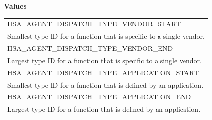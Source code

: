 \documentclass[final,oneside]{book}
\newcommand{\reftyp}[1]{#1}
\newcommand{\refenu}[1]{\reftyp{#1}}
\begin{document}
\noindent\textbf{Values}\\[-5mm]
\begin{longtable}{@{\hspace{2em}}p{\linewidth-2em}}
\hspace{-2em}\refenu{HSA_\-AGENT_\-DISPATCH_\-TYPE_\-VENDOR_\-START}\\Smallest type ID for a function that is specific to a single vendor.\\[2mm]
\hspace{-2em}\refenu{HSA_\-AGENT_\-DISPATCH_\-TYPE_\-VENDOR_\-END}\\Largest type ID for a function that is specific to a single vendor.\\[2mm]
\hspace{-2em}\refenu{HSA_\-AGENT_\-DISPATCH_\-TYPE_\-APPLICATION_\-START}\\Smallest type ID for a function that is defined by an application.\\[2mm]
\hspace{-2em}\refenu{HSA_\-AGENT_\-DISPATCH_\-TYPE_\-APPLICATION_\-END}\\Largest type ID for a function that is defined by an application.
\end{longtable}
\end{document}
